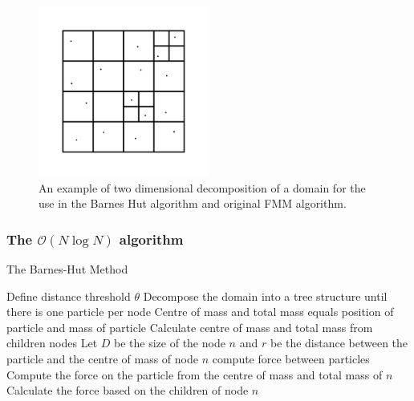 \begin{figure}
    \centering
    \includegraphics[width=0.5\textwidth]{Images/KIFMM/Decomposition.pdf}
    \caption{An example of two dimensional decomposition of a domain for the use in the Barnes Hut algorithm and original FMM algorithm.}
    \label{fig:2DDecompostion}
\end{figure}

\subsubsection{\texorpdfstring{The $\mathcal{O}(N\log N)$ algorithm}{The O(NlogN) algorithm}}

\begin{algorithm}[ht]
\caption{The Barnes-Hut Method}\label{alg:BarnesHut}
\begin{algorithmic}
\State Define distance threshold $\theta$
\State Decompose the domain into a tree structure until there is one particle per node
\State Centre of mass and total mass equals position of particle and mass of particle
\Else 
\State Calculate centre of mass and total mass from children nodes
\EndIf
\EndFor
{}
\State Let $D$ be the size of the node $n$ and $r$ be the distance between the particle and the centre of mass of node $n$
\State compute force between particles 
\Else
{}
\State Compute the force on the particle from the centre of mass and total mass of 
\State $n$
\Else
\State Calculate the force based on the children of node $n$
\EndIf
\EndIf
\EndFor
\end{algorithmic}
\end{algorithm}

